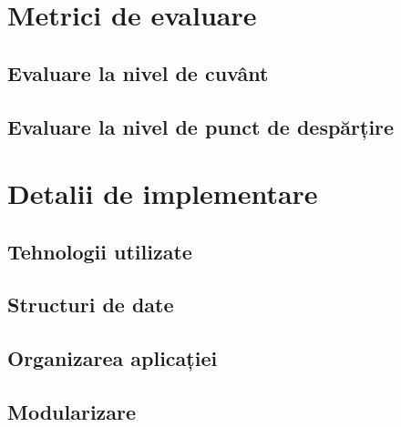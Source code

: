 \section{Metrici de evaluare}

\subsection{Evaluare la nivel de cuvânt}
\subsection{Evaluare la nivel de punct de despărțire}

\section{Detalii de implementare}
\subsection{Tehnologii utilizate}
\subsection{Structuri de date}
\subsection{Organizarea aplicației}
\subsection{Modularizare}